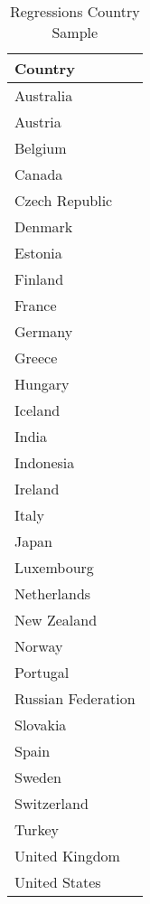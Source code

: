 \begin{table}[ht]
\centering
\caption{Regressions Country Sample} 
\label{country_sample}
{\footnotesize
\begin{tabular}{l}
  \hline
Country \\ 
  \hline
Australia \\ 
  Austria \\ 
  Belgium \\ 
  Canada \\ 
  Czech Republic \\ 
  Denmark \\ 
  Estonia \\ 
  Finland \\ 
  France \\ 
  Germany \\ 
  Greece \\ 
  Hungary \\ 
  Iceland \\ 
  India \\ 
  Indonesia \\ 
  Ireland \\ 
  Italy \\ 
  Japan \\ 
  Luxembourg \\ 
  Netherlands \\ 
  New Zealand \\ 
  Norway \\ 
  Portugal \\ 
  Russian Federation \\ 
  Slovakia \\ 
  Spain \\ 
  Sweden \\ 
  Switzerland \\ 
  Turkey \\ 
  United Kingdom \\ 
  United States \\ 
   \hline
\end{tabular}
}
\end{table}
